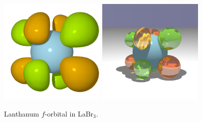 \documentclass[
  notitlepage,
  twoside,
   prb,
  floatfix,
]{revtex4-1}
\begin{document}
 \begin{figure}
  \includegraphics[width=2.0in]{figs/labr3_2}
  \includegraphics[width=2.0in]{figs/labr3_3}
  \caption{Lanthanum $f$-orbital in LaBr$_3$.}
  \label{apa5}  
 \end{figure}
 
\end{document}
